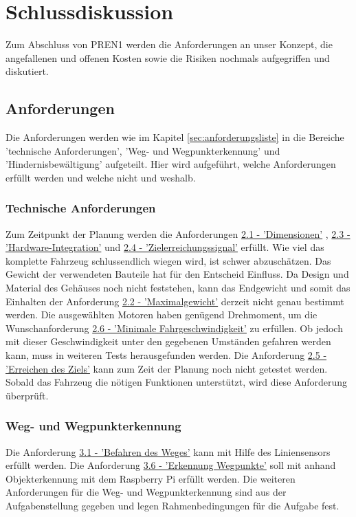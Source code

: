 \documentclass[../main.tex]{subfiles}
\begin{document}
\newpage
\section{Schlussdiskussion}

Zum Abschluss von PREN1 werden die Anforderungen an unser Konzept, die angefallenen und offenen Kosten sowie die Risiken nochmals aufgegriffen und diskutiert.
\subsection{Anforderungen}
Die Anforderungen werden wie im Kapitel \ref{sec:anforderungsliste} in die Bereiche 'technische Anforderungen', 'Weg- und Wegpunkterkennung' und 'Hindernisbewältigung' aufgeteilt. Hier wird aufgeführt, welche Anforderungen erfüllt werden und welche nicht und weshalb.

\subsubsection{Technische Anforderungen}
Zum Zeitpunkt der Planung werden die Anforderungen \hyperlink{A2.1}{2.1 - 'Dimensionen'} , \hyperlink{A2.3}{2.3 - 'Hardware-Integration'} und \hyperlink{A2.4}{2.4 - 'Zielerreichungssignal'} erfüllt. Wie viel das komplette Fahrzeug schlussendlich wiegen wird, ist schwer abzuschätzen. Das Gewicht der verwendeten Bauteile hat für den Entscheid Einfluss. Da Design und Material des Gehäuses noch nicht feststehen, kann das Endgewicht und somit das Einhalten der Anforderung \hyperlink{A2.2}{2.2 - 'Maximalgewicht'} derzeit nicht genau bestimmt werden. Die ausgewählten Motoren haben genügend Drehmoment, um die Wunschanforderung \hyperlink{A2.6}{2.6 - 'Minimale Fahrgeschwindigkeit'} zu erfüllen. Ob jedoch mit dieser Geschwindigkeit unter den gegebenen Umständen gefahren werden kann, muss in weiteren Tests herausgefunden werden.
Die Anforderung \hyperlink{A2.5}{2.5 - 'Erreichen des Ziels'} kann zum Zeit der Planung noch nicht getestet werden. Sobald das Fahrzeug die nötigen Funktionen unterstützt, wird diese Anforderung überprüft.

\subsubsection{Weg- und Wegpunkterkennung}
Die Anforderung \hyperlink{A3.1}{3.1 - 'Befahren des Weges'} kann mit Hilfe des Liniensensors erfüllt werden. Die Anforderung \hyperlink{A3.6}{3.6 - 'Erkennung Wegpunkte'} soll mit anhand Objekterkennung mit dem Raspberry Pi erfüllt werden. Die weiteren Anforderungen für die Weg- und Wegpunkterkennung sind aus der Aufgabenstellung gegeben und legen Rahmenbedingungen für die Aufgabe fest.
\end{document}
